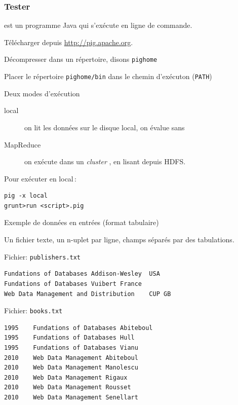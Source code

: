 \begin{frame}[fragile]
\frametitle{Tester \pig}

\pig est un programme Java qui s'exécute en ligne de commande.
\begin{redbullet}

\item Télécharger  depuis \url{http://pig.apache.org}.

\item Décompresser dans un répertoire, disons \texttt{pighome}

\item Placer le répertoire \texttt{pighome/bin} dans le chemin d'exécuton (\texttt{PATH})
\item Deux modes d'exécution
\begin{description}
\item[local] on lit les données sur le disque local, on évalue sans \mapreduce 
\item[MapReduce] on exécute dans un \textit{cluster} \mapreduce, en lisant depuis HDFS.
\end{description}



\end{redbullet}

Pour exécuter en local\,:
\begin{verbatim}
pig -x local
grunt>run <script>.pig
\end{verbatim}

\end{frame}

\begin{frame}[fragile]{Exemple de données en entrées (format tabulaire)}

Un fichier texte, un n-uplet par ligne, champs séparés par des tabulations.

\vfill

Fichier: \texttt{publishers.txt}

\footnotesize\begin{verbatim}
Fundations of Databases	Addison-Wesley	USA
Fundations of Databases	Vuibert	France
Web Data Management and Distribution	CUP	GB
\end{verbatim}

\vfill

Fichier: \texttt{books.txt}
\footnotesize\begin{verbatim}
1995	Fundations of Databases	Abiteboul
1995	Fundations of Databases	Hull
1995	Fundations of Databases	Vianu
2010	Web Data Management	Abiteboul
2010	Web Data Management	Manolescu
2010	Web Data Management	Rigaux
2010	Web Data Management	Rousset
2010	Web Data Management	Senellart
\end{verbatim}

\end{frame}


